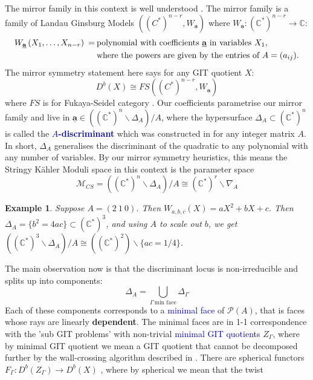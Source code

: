 \documentclass[a0]{a0poster}
\newtheorem{example}{Example}
\begin{document}
\begin{textblock}{7}
The mirror family in this context is well understood \cite[text]{cox1999mirror}. The mirror family is a family of Landau Ginsburg Models $\left( (C^*)^{n-r}, W_{\underline{\textbf{a}}} \right)$ where $W_{\underline{\textbf{a}}} : (\mathbb{C}^*)^{n-r} \to \mathbb{C}$:
\begin{align*}
  W_{\underline{\textbf{a}}} \left(X_1, \dots, X_{n-r}\right)  \:= \:&\text{polynomial with coefficients \underline{\textbf{a}} in variables $X_1$}, \\
  &\text{where the powers are given by the entries of } A = (a_{ij}).
\end{align*}
The mirror symmetry statement here says for any GIT quotient $X$:
$$
D^b(X) \cong FS\left( (C^*)^{n-r}, W_{\underline{\textbf{a}}} \right)
$$
where $FS$ is for Fukaya-Seidel category \cite{seidelfukaya}. Our coefficients parametrise our mirror family and live in $\underline{\textbf{a}} \in \left(  (\mathbb{C}^*)^n \backslash \Delta_A \right)/ A$, where the hypersurface $\Delta_A \subset (\mathbb{C}^*)^n$ is called the \textcolor{DarkBlue}{\textbf{$A$-discriminant}} which was constructed in \cite{gelfand1994discriminants} for any integer matrix $A$. In short, $\Delta_A$ generalises the discriminant of the quadratic to any polynomial with any number of variables. By our mirror symmetry heuristics, this means the Stringy Kähler Moduli space in this context is the parameter space
$$
\mathcal{M}_{CS} = \left(  (\mathbb{C}^*)^n \backslash \Delta_A \right)/ A \cong (\mathbb{C}^*)^r \backslash \nabla_A
$$
\begin{example}
  Suppose $A = (2 \: 1 \: 0)$. Then $W_{a, b, c} (X)= a X^2 + bX +c$. Then $\Delta_A = \{ b^2 = 4ac\} \subset (\mathbb{C}^*)^3$, and using $A$ to scale out $b$, we get $\left(  (\mathbb{C}^*)^3 \backslash \Delta_A \right)/ A \cong \left( (\mathbb{C}^*)^2 \right) \backslash \{ ac =1/4 \}$.
\end{example}
The main observation now is that the discriminant locus is non-irreducible and splits up into components:
$$
\Delta_A = \bigcup_{\Gamma \, \text{min face}} \Delta_\Gamma
$$
Each of these components corresponds to a \textcolor{DarkBlue}{minimal face} of $\mathcal{P}(A)$, that is faces whose rays are linearly \textbf{dependent}.
The minimal faces are in 1-1 correspondence with the 'sub GIT problems' with non-trivial \textcolor{DarkBlue}{minimal GIT quotients} $Z_{\Gamma}$, where by minimal GIT quotient we mean a GIT quotient that cannot be decomposed further by the wall-crossing algorithm described in \cite{derivedgit}. There are spherical functors $F_\Gamma: D^b(Z_\Gamma) \to D^b(X)$ \cite{addington2011new}, where by spherical we mean that the twist

\end{textblock}
\end{document}

